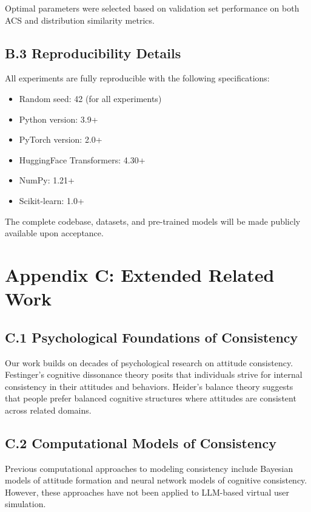 \documentclass[sigconf, anonymous]{acmart}
\begin{document}
Optimal parameters were selected based on validation set performance on both ACS and distribution similarity metrics.

\subsection*{B.3 Reproducibility Details}

All experiments are fully reproducible with the following specifications:

\begin{itemize}
    \item Random seed: 42 (for all experiments)
    \item Python version: 3.9+
    \item PyTorch version: 2.0+
    \item HuggingFace Transformers: 4.30+
    \item NumPy: 1.21+
    \item Scikit-learn: 1.0+
\end{itemize}

The complete codebase, datasets, and pre-trained models will be made publicly available upon acceptance.

\newpage
\section*{Appendix C: Extended Related Work}

\subsection*{C.1 Psychological Foundations of Consistency}

Our work builds on decades of psychological research on attitude consistency. Festinger's cognitive dissonance theory posits that individuals strive for internal consistency in their attitudes and behaviors. Heider's balance theory suggests that people prefer balanced cognitive structures where attitudes are consistent across related domains.

\subsection*{C.2 Computational Models of Consistency}

Previous computational approaches to modeling consistency include Bayesian models of attitude formation and neural network models of cognitive consistency. However, these approaches have not been applied to LLM-based virtual user simulation.
\end{document}

